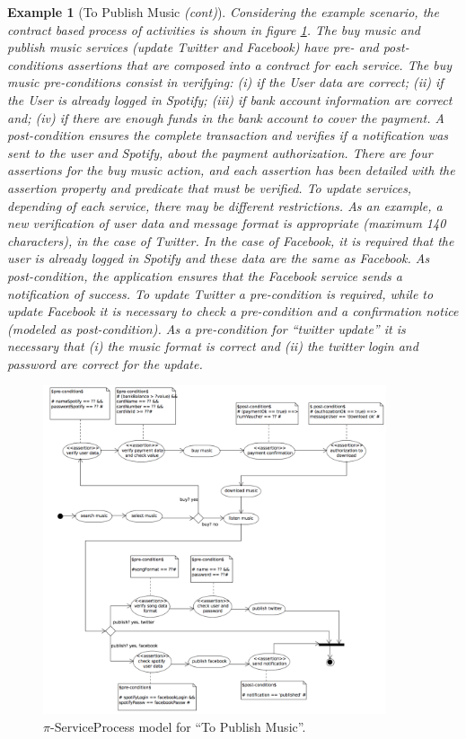 \documentclass[12pt,twoside]{article}
\theoremstyle{plain}
\theoremstyle{plain}
\newtheorem{example}{Example}
\begin{document}
\begin{multicols}{2}
\begin{example}[To Publish Music \textit{(cont)}]\label{ex:toPublicMusic3}
Considering the example scenario, the contract based process of activities  is shown in figure \ref{fig:CIM:serviceprocess}. The buy music and publish music services (update Twitter and Facebook) have pre- and post-conditions assertions that are composed into a contract for each service. The buy music pre-conditions consist in verifying:
(i) if the User data are correct;
(ii) if the User is already logged in Spotify;
(iii) if bank account information are correct and;
(iv) if there are enough funds in the bank account to cover the payment.
A post-condition ensures the complete transaction and verifies if a notification was sent to the user and Spotify, about the payment authorization. There are four assertions for the buy music action, and each assertion has been detailed with the assertion property and predicate that must be verified. To update services, depending of each service, there may be different restrictions. As an example, a new verification of user data and message format is appropriate (maximum 140 characters), in the case of Twitter. In the case of Facebook, it is required that the user is already logged in Spotify and these data are the same as Facebook.
As post-condition, the application ensures that the Facebook service sends a notification of success.
To update Twitter a pre-condition is required, while to update Facebook it is necessary to check a pre-condition and a confirmation notice (modeled as post-condition).
As a pre-condition for ``twitter update'' it is necessary that (i) the music format is correct and (ii) the twitter login and password are correct for the update.
\end{example}

\begin{figure}
\center
\includegraphics[width=0.9\textwidth]{ServiceProcess.pdf}
\caption{\label{fig:CIM:serviceprocess} $\pi$-ServiceProcess model for ``To Publish Music''.}
\end{figure}


\end{multicols}
\end{document}
